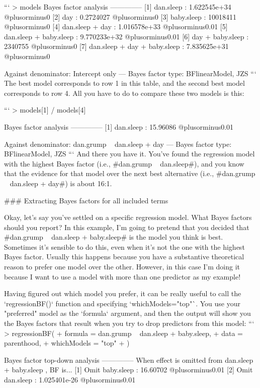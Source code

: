 ```
> models
Bayes factor analysis
--------------
[1] dan.sleep                    : 1.622545e+34 @plusorminus0%
[2] day                          : 0.2724027    @plusorminus0%
[3] baby.sleep                   : 10018411     @plusorminus0%
[4] dan.sleep + day              : 1.016578e+33 @plusorminus0.01%
[5] dan.sleep + baby.sleep       : 9.770233e+32 @plusorminus0.01%
[6] day + baby.sleep             : 2340755      @plusorminus0%
[7] dan.sleep + day + baby.sleep : 7.835625e+31 @plusorminus0%

Against denominator:
  Intercept only 
---
Bayes factor type: BFlinearModel, JZS
```
The best model corresponds to row 1 in this table, and the second best model corresponds to row 4. All you have to do to compare these two models is this:

```
> models[1] / models[4]

Bayes factor analysis
--------------
[1] dan.sleep : 15.96086 @plusorminus0.01%

Against denominator:
  dan.grump ~ dan.sleep + day 
---
Bayes factor type: BFlinearModel, JZS
```
And there you have it. You've found the regression model with the highest Bayes factor (i.e., \rtextverb#dan.grump ~ dan.sleep#), and you know that the evidence for that model over the next best alternative (i.e., \rtextverb#dan.grump ~ dan.sleep + day#) is about 16:1.


### Extracting Bayes factors for all included terms

Okay, let's say you've settled on a specific regression model. What Bayes factors should you report? In this example, I'm going to pretend that you decided that \rtextverb#dan.grump ~ dan.sleep + baby.sleep# is the model you think is best. Sometimes it's sensible to do this, even when it's not the one with the highest Bayes factor. Usually this happens because you have a substantive theoretical reason to prefer one model over the other. However, in this case I'm doing it because I want to use a model with more than one predictor as my example! 

Having figured out which model you prefer, it can be really useful to call the `regressionBF()` function and specifying  `whichModels="top"`. You use your "preferred" model as the `formula` argument, and then the output will show you the Bayes factors that result when you try to drop predictors from this model:
```
> regressionBF( 
+   formula = dan.grump ~ dan.sleep + baby.sleep,
+   data = parenthood,
+   whichModels = "top"
+ )

Bayes factor top-down analysis
--------------
When effect is omitted from dan.sleep + baby.sleep , BF is...
[1] Omit baby.sleep : 16.60702     @plusorminus0.01%
[2] Omit dan.sleep  : 1.025401e-26 @plusorminus0.01%

